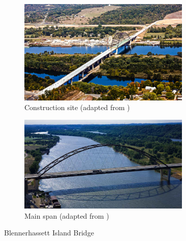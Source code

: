 \begin{figure}[H]
\centering
\begin{subfigure}{.5\textwidth}
    \centering
    \includegraphics[trim={0 0.4cm 0 0},clip, width=0.9\textwidth]{overleaf/Pictures/Blennerhassett_3.jpg}
    \caption{Construction site (adapted from \cite{Blennerhassett})}
    \label{fig:Blennerhassett_2_5}
\end{subfigure}%
\begin{subfigure}{0.5\textwidth}
    \centering
    \includegraphics[trim={0 0 0 0},clip, width=0.9\textwidth]{overleaf/Pictures/Blennerhassett_2_1.jpg}
    \caption{Main span (adapted from \cite{Blennerhassett_2})}
    \label{fig:Blennerhassett_1}
\end{subfigure}%
\caption{Blennerhassett Island Bridge}
\label{fig:Blennerhassetts}
\end{figure}

